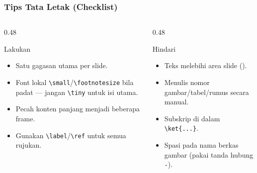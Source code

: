 \begin{frame}
  \frametitle{Tips Tata Letak (Checklist)}
  \begin{columns}[T]
    \begin{column}{0.48\textwidth}
      \begin{block}{Lakukan}
        \begin{itemize}
          \item Satu gagasan utama per slide.
          \item Font lokal \texttt{\textbackslash small}/\texttt{\textbackslash footnotesize}
                bila padat --- jangan \texttt{\textbackslash tiny} untuk isi utama.
          \item Pecah konten panjang menjadi beberapa frame.
          \item Gunakan \texttt{\textbackslash label}/\texttt{\textbackslash ref}
                untuk semua rujukan.
        \end{itemize}
      \end{block}
    \end{column}
    \hfill
    \begin{column}{0.48\textwidth}
      \begin{alertblock}{Hindari}
        \begin{itemize}
          \item Teks melebihi area slide ().%
          \item Menulis nomor gambar/tabel/rumus secara manual.
          \item Subskrip di dalam \texttt{\textbackslash ket\{...\}}.
          \item Spasi pada nama berkas gambar (pakai tanda hubung \texttt{-}).
        \end{itemize}
      \end{alertblock}
    \end{column}
  \end{columns}
\end{frame}
